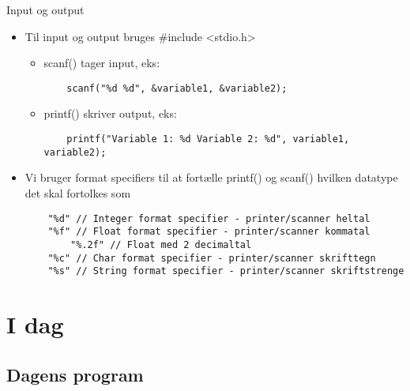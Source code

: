 \documentclass{beamer}
\begin{document}
\begin{frame}[fragile]{Input og output}
	\begin{itemize}
		\item{Til input og output bruges {\color{C_lightblue}\#include <stdio.h>}}
		\begin{itemize}
			\item{{\color{C_darkblue}scanf}() tager input, eks:}
			\begin{lstlisting}
	scanf("%d %d", &variable1, &variable2);
			\end{lstlisting}
			\item{{\color{C_darkblue}printf}() skriver output, eks:}
			\begin{lstlisting}
	printf("Variable 1: %d Variable 2: %d", variable1, variable2);
			\end{lstlisting}
		\end{itemize}
		\item{Vi bruger {\color{dkgreen}format specifiers} til at fortælle {\color{C_darkblue}printf}() og {\color{C_darkblue}scanf}() hvilken datatype det skal fortolkes som}
		\begin{lstlisting}
	"%d" // Integer format specifier - printer/scanner heltal
	"%f" // Float format specifier - printer/scanner kommatal
		"%.2f" // Float med 2 decimaltal
	"%c" // Char format specifier - printer/scanner skrifttegn
	"%s" // String format specifier - printer/scanner skriftstrenge
		\end{lstlisting}
	\end{itemize}
\end{frame}

\section{I dag}
\subsection{Dagens program}
\end{document}
